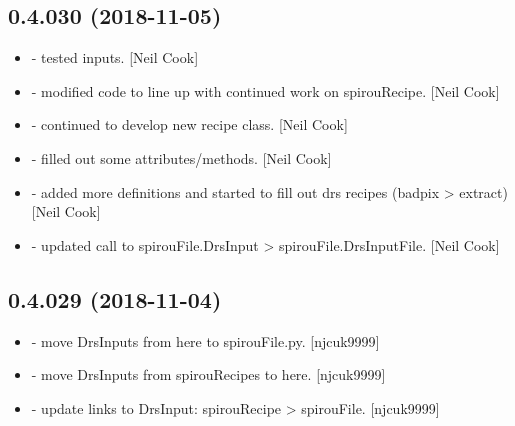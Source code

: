 \documentclass[a4paper,10pt,english]{report}
\begin{document}
\subsection{0.4.030 (2018-11-05)}
\label{\detokenize{misc/changelog:id270}}\begin{itemize}
\item {} 
 - tested  inputs. {[}Neil Cook{]}

\item {} 
 - modified code to line up with continued work on
spirouRecipe. {[}Neil Cook{]}

\item {} 
 - continued to develop new recipe class. {[}Neil Cook{]}

\item {} 
 - filled out some attributes/methods. {[}Neil Cook{]}

\item {} 
 - added more definitions and started to fill out drs
recipes (badpix \textendash{}\textgreater{} extract) {[}Neil Cook{]}

\item {} 
 - updated call to spirouFile.DrsInput \textendash{}\textgreater{}
spirouFile.DrsInputFile. {[}Neil Cook{]}

\end{itemize}


\subsection{0.4.029 (2018-11-04)}
\label{\detokenize{misc/changelog:id271}}\begin{itemize}
\item {} 
 - move DrsInputs from here to spirouFile.py.
{[}njcuk9999{]}

\item {} 
 - move DrsInputs from spirouRecipes to here. {[}njcuk9999{]}

\item {} 
 - update links to DrsInput: spirouRecipe \textendash{}\textgreater{}
spirouFile. {[}njcuk9999{]}

\end{itemize}
\end{document}
